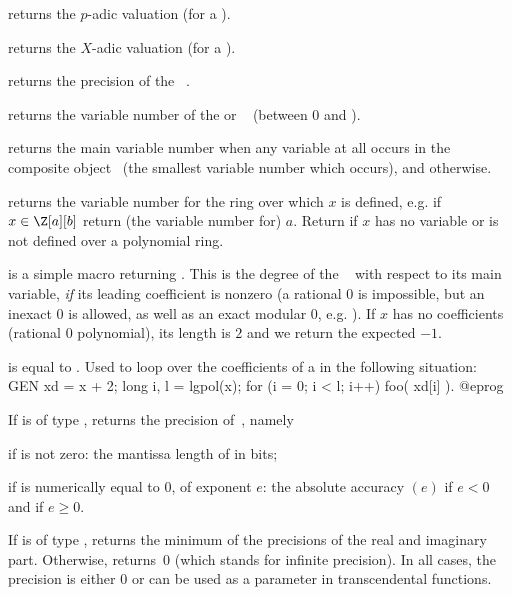  returns the $p$-adic valuation (for
a ).

 returns the $X$-adic valuation (for a ).

 returns the precision of the ~.

 returns the variable number of the
 or ~ (between 0 and ).

 returns the main variable number when any variable
at all occurs in the composite object~ (the smallest variable number
which occurs), and  otherwise.

 returns the variable number for the ring over which
$x$ is defined, e.g. if $x\in \Z[a][b]$ return (the variable number for)
$a$. Return  if $x$ has no variable or is not defined over a
polynomial ring.

 is a simple macro returning .
This is the degree of the ~ with respect to its main
variable, \emph{if} its leading coefficient is nonzero (a rational $0$ is
impossible, but an inexact $0$ is allowed, as well as an exact modular $0$,
e.g. ). If $x$ has no coefficients (rational $0$ polynomial),
its length is $2$ and we return the expected $-1$.

 is equal to . Used to loop over
the coefficients of a  in the following situation:
\bprog
    GEN xd = x + 2;
    long i, l = lgpol(x);
    for (i = 0; i < l; i++) foo( xd[i] ).
@eprog

 If  is of type , returns the
precision of~, namely

\item if  is not zero: the mantissa length of  in bits;

\item if  is numerically equal to $0$, of exponent $e$:
the absolute accuracy $(e)$ if $e < 0$ and
 if $e \geq 0$.

If  is of type , returns the minimum of the precisions of
the real and imaginary part. Otherwise, returns~0 (which stands for infinite
precision). In all cases, the precision is either $0$ or can be used as a
 parameter in transcendental functions.

